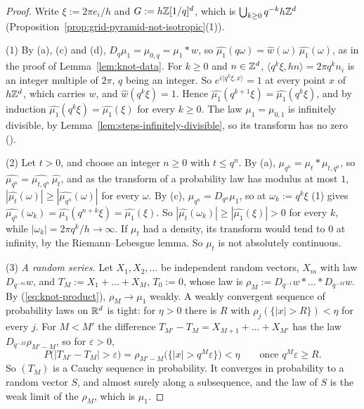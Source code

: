 \begin{proof}
Write $\xi := 2\pi e_i/h$ and $G := h\mathbb{Z}[1/q]^d$, which is
$\bigcup_{k \ge 0}q^{-k}h\mathbb{Z}^d$ (Proposition~\ref{prop:grid-pyramid-not-isotropic}(1)).

(1) By (a), (c) and (d), $D_q\mu_1 = \mu_{0,q} = \mu_1 * w$, so
$\widehat{\mu_1}(q\omega) = \widehat{w}(\omega)\,\widehat{\mu_1}(\omega)$, as in the proof of
Lemma~\ref{lem:knot-data}. For $k \ge 0$ and $n \in \mathbb{Z}^d$,
$\langle q^k\xi, hn\rangle = 2\pi q^kn_i$ is an integer multiple of $2\pi$, $q$ being an integer.
So $e^{i\langle q^k\xi, x\rangle} = 1$ at every point $x$ of $h\mathbb{Z}^d$, which carries $w$, and
$\widehat w(q^k\xi) = 1$. Hence $\widehat{\mu_1}(q^{k+1}\xi) = \widehat{\mu_1}(q^k\xi)$, and by
induction $\widehat{\mu_1}(q^k\xi) = \widehat{\mu_1}(\xi)$ for every $k \ge 0$. The law
$\mu_1 = \mu_{0,1}$ is infinitely divisible, by Lemma~\ref{lem:steps-infinitely-divisible}, so its
transform has no zero ().

(2) Let $t > 0$, and choose an integer $n \ge 0$ with $t \le q^n$. By (a),
$\mu_{q^n} = \mu_t * \mu_{t,q^n}$, so $\widehat{\mu_{q^n}} = \widehat{\mu_{t,q^n}}\,\widehat{\mu_t}$,
and as the transform of a probability law has modulus at most $1$,
$|\widehat{\mu_t}(\omega)| \ge |\widehat{\mu_{q^n}}(\omega)|$ for every $\omega$. By (c),
$\mu_{q^n} = D_{q^n}\mu_1$, so at $\omega_k := q^k\xi$ (1) gives
$\widehat{\mu_{q^n}}(\omega_k) = \widehat{\mu_1}(q^{n+k}\xi) = \widehat{\mu_1}(\xi)$. So
$|\widehat{\mu_t}(\omega_k)| \ge |\widehat{\mu_1}(\xi)| > 0$ for every $k$, while
$|\omega_k| = 2\pi q^k/h \to \infty$. If $\mu_t$ had a density, its transform would tend to $0$ at
infinity, by the Riemann--Lebesgue lemma. So $\mu_t$ is not absolutely continuous.

(3) \emph{A random series.} Let $X_1, X_2, \dots$ be independent random vectors, $X_m$ with law
$D_{q^{-m}}w$, and $T_M := X_1 + \dots + X_M$, $T_0 := 0$, whose law is
$\rho_M := D_{q^{-1}}w * \dots * D_{q^{-M}}w$. By (\ref{eq:knot-product}), $\rho_M \to \mu_1$
weakly. A weakly convergent sequence of probability laws on $\mathbb{R}^d$ is tight: for $\eta > 0$ there
is $R$ with $\rho_j(\{|x| > R\}) < \eta$ for every $j$. For $M < M'$ the difference
$T_{M'} - T_M = X_{M+1} + \dots + X_{M'}$ has the law $D_{q^{-M}}\rho_{M'-M}$, so for
$\varepsilon > 0$,
\[
  P\bigl(|T_{M'} - T_M| > \varepsilon\bigr) = \rho_{M'-M}\bigl(\{|x| > q^M\varepsilon\}\bigr) < \eta
  \qquad\text{once } q^M\varepsilon \ge R .
\]
So $(T_M)$ is a Cauchy sequence in probability. It converges in probability to a random vector
$S$, and almost surely along a subsequence, and the law of $S$ is the weak limit of the $\rho_M$,
which is $\mu_1$.


\end{proof}
